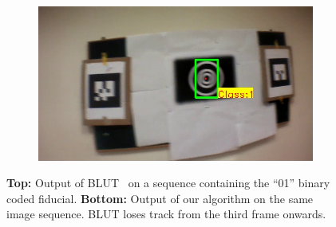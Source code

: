 \documentclass[10pt,twocolumn,letterpaper]{article}
\begin{document}
\begin{figure}
\begin{subfigure}[b]{.19\textwidth}
\end{subfigure}
\begin{subfigure}[b]{.19\textwidth}
\includegraphics[width=\linewidth]{images/BLUT_input_01/output15.jpg}
\end{subfigure}
\caption{{\bf Top:} Output of BLUT~\cite{Wu:2011} on a sequence containing
the ``01'' binary coded fiducial. {\bf Bottom:} Output of our
algorithm on the same image 
sequence. BLUT loses  track from the third frame onwards.}
\label{fig:BLUT_compare_01}
\end{figure}
\end{document}
